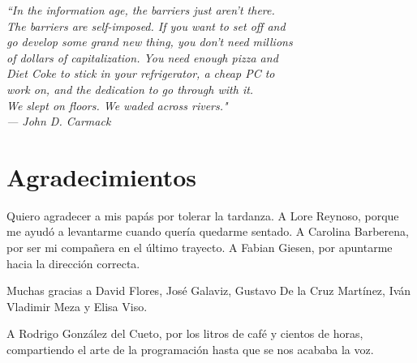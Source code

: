 
\begin{flushright}{\slshape
        ``In the information age, the barriers just aren't there. \\
        The barriers are self-imposed. If you want to set off and\\
        go develop some grand new thing, you don't need millions \\
        of dollars of capitalization. You need enough pizza and  \\
        Diet Coke to stick in your refrigerator, a cheap PC to   \\
        work on, and the dedication to go through with it.       \\
        We slept on floors.  We waded across rivers."            \\
    --- \textit{John D. Carmack}}
\end{flushright}



\bigskip

\begingroup
\let\clearpage\relax
\let\cleardoublepage\relax
\let\cleardoublepage\relax
\chapter*{Agradecimientos}

Quiero agradecer a mis papás por tolerar la tardanza. A Lore Reynoso, porque me
ayudó a levantarme cuando quería quedarme sentado. A Carolina Barberena, por
ser mi compañera en el último trayecto. A Fabian Giesen, por apuntarme hacia la
dirección correcta.

Muchas gracias a  David Flores, José Galaviz, Gustavo De la Cruz Martínez, Iván
Vladimir Meza y  Elisa Viso.

A Rodrigo González del Cueto, por los litros de café y cientos de horas,
compartiendo el arte de la programación hasta que se nos acababa la voz.


\bigskip


\endgroup

